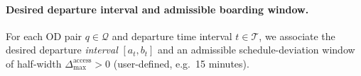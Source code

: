 \paragraph{Desired departure interval and admissible boarding window.}
For each OD pair $q\in\mathcal{Q}$ and departure time interval $t\in\mathcal{T}$,
we associate the desired departure \emph{interval} $[a_t,b_t]$ and an admissible
schedule-deviation window of half-width $\Delta_{\max}^{\mathrm{access}}>0$
(user-defined, e.g.\ 15 minutes).


